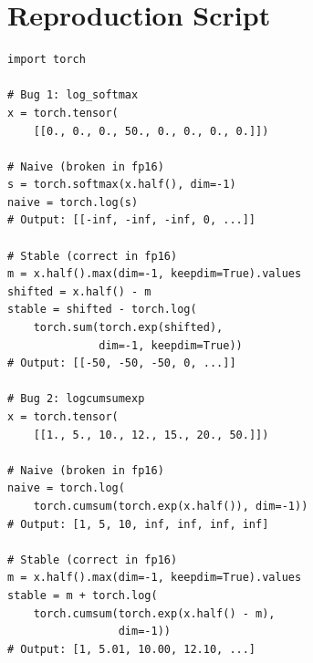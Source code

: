 \documentclass[10pt,twocolumn]{article}
\newcommand{\fp}{\texttt{fp16}}
\begin{document}
\section{Reproduction Script}
\label{app:repro}

\begin{lstlisting}[caption={Minimal reproduction demonstrating both
  the log\_softmax underflow and logcumsumexp overflow bugs in
  simulated \fp{} arithmetic.}]
import torch

# Bug 1: log_softmax
x = torch.tensor(
    [[0., 0., 0., 50., 0., 0., 0., 0.]])

# Naive (broken in fp16)
s = torch.softmax(x.half(), dim=-1)
naive = torch.log(s)
# Output: [[-inf, -inf, -inf, 0, ...]]

# Stable (correct in fp16)
m = x.half().max(dim=-1, keepdim=True).values
shifted = x.half() - m
stable = shifted - torch.log(
    torch.sum(torch.exp(shifted),
              dim=-1, keepdim=True))
# Output: [[-50, -50, -50, 0, ...]]

# Bug 2: logcumsumexp
x = torch.tensor(
    [[1., 5., 10., 12., 15., 20., 50.]])

# Naive (broken in fp16)
naive = torch.log(
    torch.cumsum(torch.exp(x.half()), dim=-1))
# Output: [1, 5, 10, inf, inf, inf, inf]

# Stable (correct in fp16)
m = x.half().max(dim=-1, keepdim=True).values
stable = m + torch.log(
    torch.cumsum(torch.exp(x.half() - m),
                 dim=-1))
# Output: [1, 5.01, 10.00, 12.10, ...]
\end{lstlisting}
\end{document}
